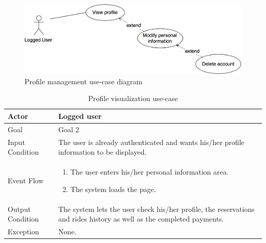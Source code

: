 \begin{figure}[H]
\begin{center}
		\includegraphics[width=\textwidth]{./specific_requirements/features/diagrams/man_profile_uc.png}
		\caption{Profile management use-case diagram}
		\label{man_profile_uc}
\end{center}
\end{figure}

\begin{table}[H]
\begin{center}
\begin{tabular}{p{} | p{}}
\hline
Actor & Logged user\\
\hline
Goal & Goal 2\\
\hline
Input Condition & The user is already authenticated and wants his/her profile information to be displayed.\\
\hline
Event Flow & 
\begin{enumerate}
\item The user enters his/her personal information area.
\item The system loads the page.
\end{enumerate} \\
\hline
Output Condition & The system lets the user check his/her profile, the reservations and rides history as well as the completed payments.\\
\hline
Exception & 
None.\\
\hline
\end{tabular}
\end{center}
\caption{Profile visualization use-case}
\label{view_profile_uc}
\end{table}

